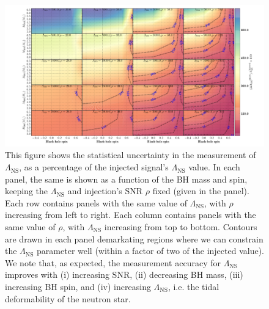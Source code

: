 \documentclass[aps,prd,amsmath,floats,floatfix, twocolumn,
superscriptaddress,nofootinbib,showpacs]{revtex4-1}
\newcommand{\lambdans}{\Lambda_\mathrm{NS}}
\begin{document}
\begin{figure}
\centering    
\includegraphics[trim={3cm 0 0 0},width=2.3\columnwidth]{plots/TTLambdaCIWidths90_0_Lambda_SNR.pdf}
\caption{This figure shows the statistical uncertainty in the measurement of
$\lambdans$, as a percentage of the injected signal's $\lambdans$ value. In each panel,
the same is shown as a function of the BH mass and spin, keeping the 
$\lambdans$ and injection's SNR $\rho$ fixed (given in the panel). Each row contains
panels with the same value of $\lambdans$, with $\rho$ increasing from left to right.
Each column contains panels with the same value of $\rho$, with $\lambdans$ 
increasing from top to bottom.
% 
Contours are drawn in each panel demarkating regions where we can constrain the
$\lambdans$ parameter well (within a factor of two of the injected value).
% 
We note that, as expected, the measurement accuracy for $\lambdans$ improves with (i) increasing
SNR, (ii) decreasing BH mass, (iii) increasing BH spin, and 
(iv) increasing $\lambdans$, i.e. the tidal deformability of the neutron star.
}
\label{fig:TT_LambdaCIWidths90_0_Lambda_SNR}
\end{figure}
% 
\end{document}

